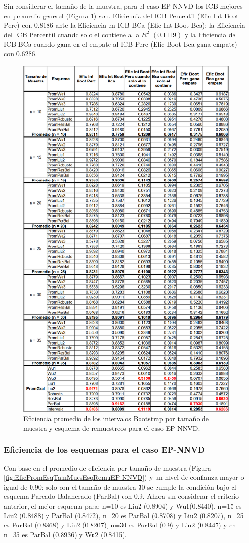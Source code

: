Sin considerar el tamaño de la muestra, para el caso EP-NNVD los ICB mejores en promedio general  (Figura \ref{fig:EficPromIntBootsTamMuestEsqRemuEP-NNVD}) son: Eficiencia del ICB Percentil (Efic Int Boot Perc) con $0.8186$ ante la Eficiencia en ICB BCa (Efic Int Boot Bca); la Eficiencia del ICB Percentil cuando solo el contiene a la $R^{2}$ $(0.1119)$ y la Eficiencia de ICB BCa cuando gana en el empate al ICB Perc (Efic Boot Bca gana empate) con $0.6286$.


\begin{figure}[ht] 
	\centering 
	\includegraphics[width=0.55\linewidth]{img/EP_NNVD_Efic_Boots.png} 
	\caption{Eficiencia promedio de los intervalos Bootstrap por tamaño de muestra y esquema de remuestreos para el caso EP-NNVD.} 
	\label{fig:EficPromIntBootsTamMuestEsqRemuEP-NNVD}
\end{figure}
\FloatBarrier

\subsubsection{Eficiencia de los esquemas para el caso EP-NNVD}
Con base en el promedio de eficiencia por tamaño de muestra (Figura \ref{fig:EficPromEsqTamMuesEsqRemuEP-NNVD}) y un nivel de confianza mayor o igual de 0.90: solo con el tamaño de muestra 30 se cumple la condición bajo el esquema Pareado Balanceado (ParBal) con 0.9. Ahora sin considerar el criterio anterior, el mejor esquema para: n=10 es Liu2 (0.8904) y Wu1(0.8440), n=15 es Liu2 (0.8488) y ParBal (0.8472), n=20 es ParBal (0.8708) y Liu2 (0.8207), n=25 es ParBal (0.8868) y Liu2 (0.8207), n=30 es ParBal (0.9) y Liu2 (0.8447) y en n=35 es ParBal (0.8936) y Wu2 (0.8415).  
\vspace{.5cm}


